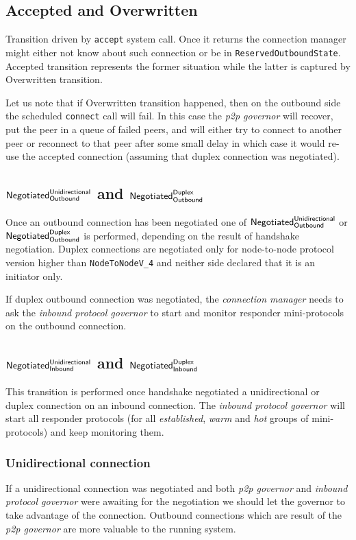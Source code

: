 \documentclass{article}
\def\ReservedOutboundState{\texttt{ReservedOutboundState}}
\def\Accepted{\textsf{Accepted}}
\def\Overwritten{\textsf{Overwritten}}
\def\NegotiatedUniOut{$\text{\textsf{Negotiated}}^\text{\textsf{Unidirectional}}_\text{\textsf{Outbound}}$}
\def\NegotiatedDupOut{$\text{\textsf{Negotiated}}^\text{\textsf{Duplex}}_\text{\textsf{Outbound}}$}
\def\NegotiatedUniIn{$\text{\textsf{Negotiated}}^\text{\textsf{Unidirectional}}_\text{\textsf{Inbound}}$}
\def\NegotiatedDupIn{$\text{\textsf{Negotiated}}^\text{\textsf{Duplex}}_\text{\textsf{Inbound}}$}
\def\warm{\textit{warm}}
\def\hot{\textit{hot}}
\def\established{\textit{established}}
\def\ptopgov{\textit{p2p governor}}
\newcommand{\todoimpl}[1]{\todo[backgroundcolor=red,linecolor=red]{#1}}
\begin{document}
\subsection{\Accepted{} and \Overwritten{}}
Transition driven by \texttt{accept} system call.  Once it returns the
connection manager might either not know about such connection or be in
\ReservedOutboundState{}.  \Accepted{} transition represents the former
situation while the latter is captured by \Overwritten{} transition.

Let us note that if \Overwritten{} transition happened, then on the outbound
side the scheduled \texttt{connect} call will fail.  In this case the
\ptopgov{} will recover, put the peer in a queue of failed peers, and
will either try to connect to another peer or reconnect to that peer after some
small delay in which case it would re-use the accepted connection (assuming that
duplex connection was negotiated).

\subsection{\NegotiatedUniOut{} and \NegotiatedDupOut{}}
Once an outbound connection has been negotiated one of \NegotiatedUniOut{} or
\NegotiatedDupOut{} is performed, depending on the result of handshake
negotiation.  Duplex connections are negotiated only for node-to-node protocol
version higher than \texttt{NodeToNodeV\_4}\todoimpl{the exact version number will change} and neither
side declared that it is an initiator only.

If duplex outbound connection was negotiated, the \textit{connection manager}
needs to ask the \textit{inbound protocol governor} to start and monitor
responder mini-protocols on the outbound connection.

\subsection{\NegotiatedUniIn{} and \NegotiatedDupIn{}}
This transition is performed once handshake negotiated a unidirectional or
duplex connection on an inbound connection.  The \textit{inbound protocol
governor} will start all responder protocols (for all \established{}, \warm{}
and \hot{} groups of mini-protocols) and keep monitoring them.

\subsubsection{Unidirectional connection}
If a unidirectional connection was negotiated and both \ptopgov{} and
\textit{inbound protocol governor} were awaiting for the negotiation we should
let the governor to take advantage of the connection.   Outbound connections
which are result of the \ptopgov{} are more valuable to the running
system.
\end{document}
